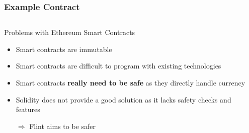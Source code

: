 \documentclass[aspectratio=169]{beamer}
\begin{document}
\begin{frame}
\frametitle{Example Contract}
\inputminted[fontsize=\tiny]{swift}{code/wallet.flint}
\end{frame}


%
%
%
\begin{frame}{Problems with Ethereum Smart Contracts}
    \begin{itemize}
        \item Smart contracts are immutable
        \item Smart contracts are difficult to program with existing technologies
        \item Smart contracts \textbf{really need to be safe} as they directly handle currency
        \item Solidity does not provide a good solution as it lacks safety checks and features
        \item[$\Rightarrow$] Flint aims to be safer
    \end{itemize}
\end{frame}
\end{document}
